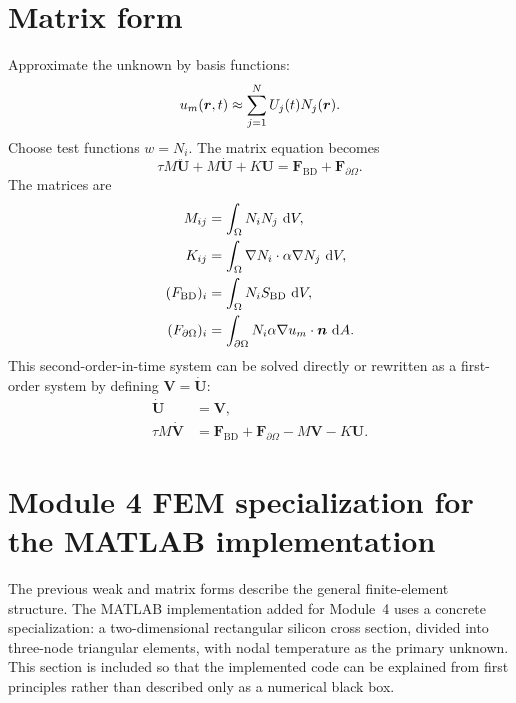 \documentclass[11pt]{article}
\begin{document}
\section{Matrix form}
Approximate the unknown by basis functions:
\begin{equation}
    u_m(\bm{r},t)\approx\sum_{j=1}^{N}U_j(t)N_j(\bm{r}).
\end{equation}
Choose test functions \(w=N_i\). The matrix equation becomes
\begin{equation}
    \boxed{\tau M\ddot{\bm{U}}+M\dot{\bm{U}}+K\bm{U}=\bm{F}_{\mathrm{BD}}+\bm{F}_{\partial\Omega}.}
    \label{eq:matrix_bd}
\end{equation}
The matrices are
\begin{align}
    M_{ij} &=\int_\Omega N_iN_j\,\mathop{}\!\mathrm{d} V,\\
    K_{ij} &=\int_\Omega \nabla N_i\cdot\alpha\nabla N_j\,\mathop{}\!\mathrm{d} V,\\
    (F_{\mathrm{BD}})_i &=\int_\Omega N_iS_{\mathrm{BD}}\,\mathop{}\!\mathrm{d} V,\\
    (F_{\partial\Omega})_i &=\int_{\partial\Omega}N_i\alpha\nabla u_m\cdot\bm{n}\,\mathop{}\!\mathrm{d} A.
\end{align}
This second-order-in-time system can be solved directly or rewritten as a first-order system by defining \(\bm{V}=\dot{\bm{U}}\):
\begin{align}
    \dot{\bm{U}}&=\bm{V},\\
    \tau M\dot{\bm{V}}&=\bm{F}_{\mathrm{BD}}+\bm{F}_{\partial\Omega}-M\bm{V}-K\bm{U}.
\end{align}

\section{Module 4 FEM specialization for the MATLAB implementation}
The previous weak and matrix forms describe the general finite-element structure. The MATLAB implementation added for Module~4 uses a concrete specialization: a two-dimensional rectangular silicon cross section, divided into three-node triangular elements, with nodal temperature as the primary unknown. This section is included so that the implemented code can be explained from first principles rather than described only as a numerical black box.
\end{document}
